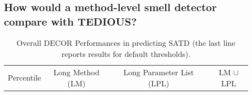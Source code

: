 \subsection{How would a method-level smell detector compare with TEDIOUS?}


\begin{landscape}
\begin{table*}[t]
	\caption{Top 10 discriminant features (cross-project prediction). (M): source code metrics,  (CS): CheckStyle checks, (P): PMD checks.}
	\label{tab:top10featuresac}
	\centering\scriptsize
	\vspace{-2mm}
\end{table*}
\begin{table*}[t]
	\caption{Overall DECOR Performances in predicting SATD (the last line reports results for default thresholds).}
	\label{tab:decor}
	\centering
		\begin{adjustbox}{center}
			\begin{tabular}{lccccclccccclccccc}
				\multirow{2}{*}{Percentile} & \multicolumn{5}{c}{Long Method (LM)} & & \multicolumn{5}{c}{Long Parameter List (LPL)} & & \multicolumn{5}{c}{LM $\cup$ LPL}\\

\end{tabular}
\end{adjustbox}
\end{table*}
\end{landscape}
